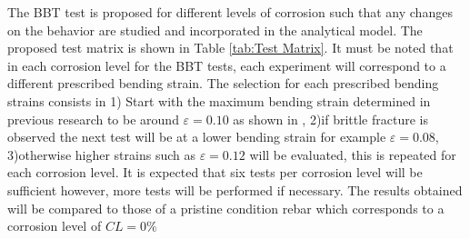 The BBT test is proposed for different levels of corrosion such that any changes on the behavior are studied and incorporated in the analytical model. The proposed test matrix is shown in Table \ref{tab:Test Matrix}. It must be noted that in each corrosion level for the BBT tests, each experiment will correspond to a different prescribed bending strain. The selection for each prescribed bending strains consists in 1) Start with the maximum bending strain determined in previous research to be around $\varepsilon=0.10$ as shown in , 2)if brittle fracture is observed the next test will be at a lower bending strain for example $\varepsilon=0.08$, 3)otherwise higher strains such as $\varepsilon=0.12$ will be evaluated, this is repeated for each corrosion level. It is expected that six tests per corrosion level will be sufficient however, more tests will be performed if necessary. The results obtained will be compared to those of a pristine condition rebar which corresponds to a corrosion level of $CL=0\%$

